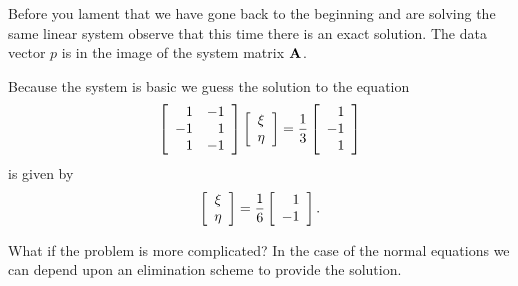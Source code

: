Before you lament that we have gone back to the beginning and are solving the same linear system observe that this time there is an exact solution. The data vector $p$ is in the image of  the system matrix $\A{}$. 

Because the system is basic we guess the solution to the equation
\begin{equation}
 \Aexample \mat{c}{\xi\\\eta} = \frac{1}{3}\mat{r}{1\\-1\\1}
\end{equation}
is given by
\begin{equation}
  \mat{c}{\xi\\\eta}=\frac{1}{6}\mat{r}{1\\-1}.
\end{equation}

What if the problem is more complicated? In the case of the normal equations we can depend upon an elimination scheme to provide the solution.

\endinput